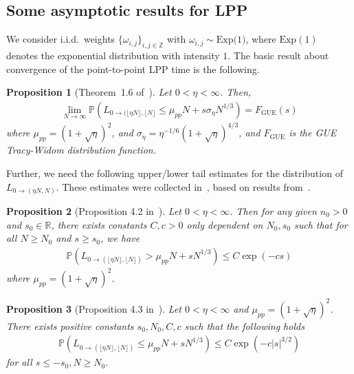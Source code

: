 \documentclass[12pt,a4paper]{article}
\numberwithin{equation}{section}
\newcommand{\GUE}{\mathrm{GUE}}
\newcommand{\Pb}{\mathbb{P}}
\newcommand{\R}{\mathbb{R}}
\newcommand{\Z}{\mathbb{Z}}
\newtheorem{prop}{Proposition}[section]
\begin{document}
\subsection{Some asymptotic results for LPP}\label{Sec2Sub2}
We consider i.i.d.\ weights $\{\omega_{i,j}\}_{i,j\in \Z}$ with $\omega_{i,j } \sim \mbox{Exp(1)}$, where
 $\mbox{Exp}(1)$ denotes the exponential distribution with intensity $1$.
The basic result about convergence of the point-to-point LPP time is the following.
\begin{prop}[Theorem~1.6 of~\cite{Jo00b}]\label{propPtToPt}
Let $0<\eta<\infty$. Then,
\begin{align}\label{eq:LPPPointToPoint}
\lim_{N\to \infty} \Pb\left(L_{0\to (\lfloor \eta N\rfloor, \lfloor N\rfloor}\leq \mu_{pp}N+s \sigma_{\eta} N^{1/3}\right) = F_\GUE (s)
\end{align}
where $\mu_{pp} = (1+\sqrt{\eta})^2$, and $\sigma_{\eta} = \eta^{-1/6}(1+\sqrt{\eta})^{4/3}$, and $F_\GUE$ is the GUE Tracy-Widom distribution function.
 \end{prop}
Further, we need the following upper/lower tail estimates for the distribution of $L_{0\to (\eta N, N)}$. These estimates were collected in~\cite{FN13}, based on results from~\cite{BBP06,BFP12,FS05a}.

\begin{prop}[Proposition 4.2 in~\cite{FN13}]\label{ppUpTail} Let $0<\eta<\infty$. Then for any given $n_0>0$ and $s_0\in \R$, there exists constants $C,c>0$ only dependent on $N_0,s_0$ such that for all $N\geq N_0$ and $s\geq s_0$, we have
 \begin{align}\label{eq:ppUpTailBd}
 \Pb\left(L_{0\to (\lfloor \eta N\rfloor, \lfloor N\rfloor)}>\mu_{pp}N +s N^{1/3}\right)\leq C\exp(-cs)
\end{align}
 where $\mu_{pp}=(1+\sqrt{\eta})^2$.
 \end{prop}


 \begin{prop}[Proposition 4.3 in~\cite{FN13}]\label{ppLowTail} Let $0<\eta<\infty$ and $\mu_{pp}=(1+\sqrt{\eta})^2$. There exists positive constants $s_0,N_0,C,c$ such that the following holds
 \begin{align}
 \Pb\left(L_{0\to (\lfloor \eta N\rfloor, \lfloor N\rfloor )}\leq \mu_{pp}N+sN^{1/3}\right)\leq C\exp(-c|s|^{3/2})
 \end{align}
 for all $s\leq -s_0, N\geq N_0$.
 \end{prop}
\end{document}
